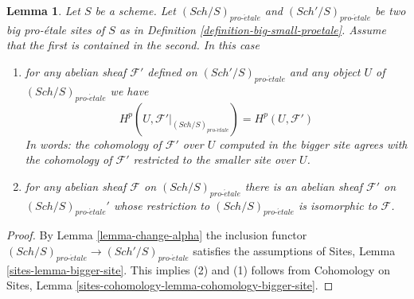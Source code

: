 \documentclass{stacks-project}
\theoremstyle{plain}
\newtheorem{lemma}[subsection]{Lemma}
\theoremstyle{definition}
\theoremstyle{remark}
\numberwithin{equation}{subsection}
\def\Sch{\mathit{Sch}}
\def\proetale{{pro\text{-}\acute{e}tale}}
\begin{document}
\begin{lemma}
\label{lemma-cohomology-enlarge-partial-universe}
Let $S$ be a scheme. Let $(\Sch/S)_\proetale$ and $(\Sch'/S)_\proetale$ be two
big pro-\'etale sites of $S$ as in
Definition \ref{definition-big-small-proetale}.
Assume that the first is contained in
the second. In this case
\begin{enumerate}
\item for any abelian sheaf $\mathcal{F}'$ defined on $(\Sch'/S)_\proetale$
and any object $U$ of $(\Sch/S)_\proetale$ we have
$$
H^p(U, \mathcal{F}'|_{(\Sch/S)_\proetale}) =
H^p(U, \mathcal{F}')
$$
In words: the cohomology of $\mathcal{F}'$ over $U$ computed in the bigger site
agrees with the cohomology of $\mathcal{F}'$ restricted to the smaller site
over $U$.
\item for any abelian sheaf $\mathcal{F}$ on $(\Sch/S)_\proetale$ there is an
abelian sheaf $\mathcal{F}'$ on $(\Sch/S)_\proetale'$ whose restriction to
$(\Sch/S)_\proetale$ is isomorphic to $\mathcal{F}$.
\end{enumerate}
\end{lemma}

\begin{proof}
By Lemma \ref{lemma-change-alpha} the inclusion functor
$(\Sch/S)_\proetale \to (\Sch'/S)_\proetale$ satisfies the assumptions of
Sites, Lemma \ref{sites-lemma-bigger-site}. This implies (2) and (1)
follows from
Cohomology on Sites, Lemma \ref{sites-cohomology-lemma-cohomology-bigger-site}.
\end{proof}














\end{document}
